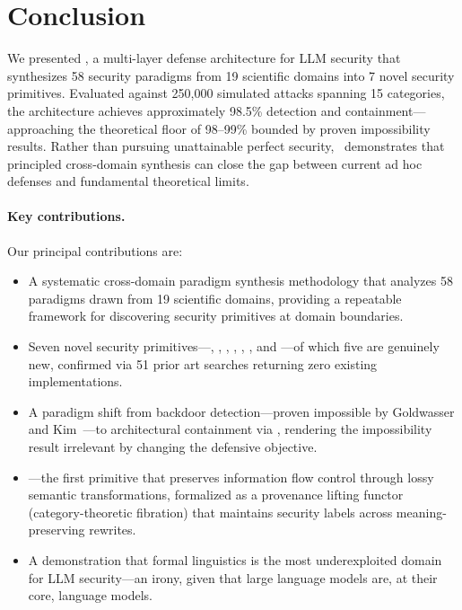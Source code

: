 \section{Conclusion}
\label{sec:conclusion}

We presented \sentinel, a multi-layer defense architecture for LLM security
that synthesizes 58 security paradigms from 19 scientific domains into 7 novel
security primitives. Evaluated against 250,000 simulated attacks spanning 15
categories, the architecture achieves approximately 98.5\% detection and
containment---approaching the theoretical floor of 98--99\% bounded by proven
impossibility results. Rather than pursuing unattainable perfect security,
\sentinel~demonstrates that principled cross-domain synthesis can close the gap
between current ad hoc defenses and fundamental theoretical limits.

\paragraph{Key contributions.}
Our principal contributions are:

\begin{itemize}
  \item A systematic cross-domain paradigm synthesis methodology that analyzes
    58 paradigms drawn from 19 scientific domains, providing a repeatable
    framework for discovering security primitives at domain boundaries.

  \item Seven novel security primitives---\pasr, \cafl, \gps, \aas, \irm,
    \mire, and \tsa---of which five are genuinely new, confirmed via 51
    prior art searches returning zero existing implementations.

  \item A paradigm shift from backdoor detection---proven impossible by
    Goldwasser and Kim~\cite{goldwasser2022}---to architectural containment
    via \mire, rendering the impossibility result irrelevant by changing the
    defensive objective.

  \item \pasr---the first primitive that preserves information flow control
    through lossy semantic transformations, formalized as a provenance lifting
    functor (category-theoretic fibration) that maintains security labels
    across meaning-preserving rewrites.

  \item A demonstration that formal linguistics is the most underexploited
    domain for LLM security---an irony, given that large language models are,
    at their core, language models.
\end{itemize}

